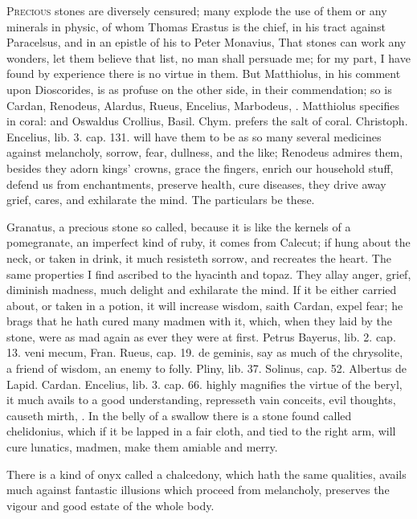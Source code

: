 {\lettrine{P}{recious} stones are diversely censured; many explode the use of them or
any minerals in physic, of whom Thomas Erastus is the chief, in his
tract against Paracelsus, and in an epistle of his to Peter Monavius,
 That stones can work any wonders, let them believe that list, no
man shall persuade me; for my part, I have found by experience there is
no virtue in them. But Matthiolus, in his comment upon
Dioscorides, is as profuse on the other side, in their
commendation; so is Cardan, Renodeus, Alardus, Rueus, Encelius,
Marbodeus, \etc{}. Matthiolus specifies in coral: and Oswaldus
Crollius, Basil. Chym. prefers the salt of coral. Christoph.
Encelius, lib. 3. cap. 131. will have them to be as so many several
medicines against melancholy, sorrow, fear, dullness, and the like;
Renodeus admires them, besides they adorn kings' crowns, grace
the fingers, enrich our household stuff, defend us from enchantments,
preserve health, cure diseases, they drive away grief, cares, and
exhilarate the mind. The particulars be these.

Granatus, a precious stone so called, because it is like the kernels of
a pomegranate, an imperfect kind of ruby, it comes from Calecut;
if hung about the neck, or taken in drink, it much resisteth
sorrow, and recreates the heart. The same properties I find ascribed to
the hyacinth and topaz. They allay anger, grief, diminish
madness, much delight and exhilarate the mind. If it be either
carried about, or taken in a potion, it will increase wisdom, saith
Cardan, expel fear; he brags that he hath cured many madmen with it,
which, when they laid by the stone, were as mad again as ever they were
at first. Petrus Bayerus, lib. 2. cap. 13. veni mecum, Fran. Rueus,
cap. 19. de geminis, say as much of the chrysolite, a friend of
wisdom, an enemy to folly. Pliny, lib. 37. Solinus, cap. 52. Albertus
de Lapid. Cardan. Encelius, lib. 3. cap. 66. highly magnifies the
virtue of the beryl, it much avails to a good understanding,
represseth vain conceits, evil thoughts, causeth mirth, \etc{}. In the
belly of a swallow there is a stone found called chelidonius,
which if it be lapped in a fair cloth, and tied to the right arm,
will cure lunatics, madmen, make them amiable and merry.

There is a kind of onyx called a chalcedony, which hath the same
qualities, avails much against fantastic illusions which proceed
from melancholy, preserves the vigour and good estate of the whole
body.

}
